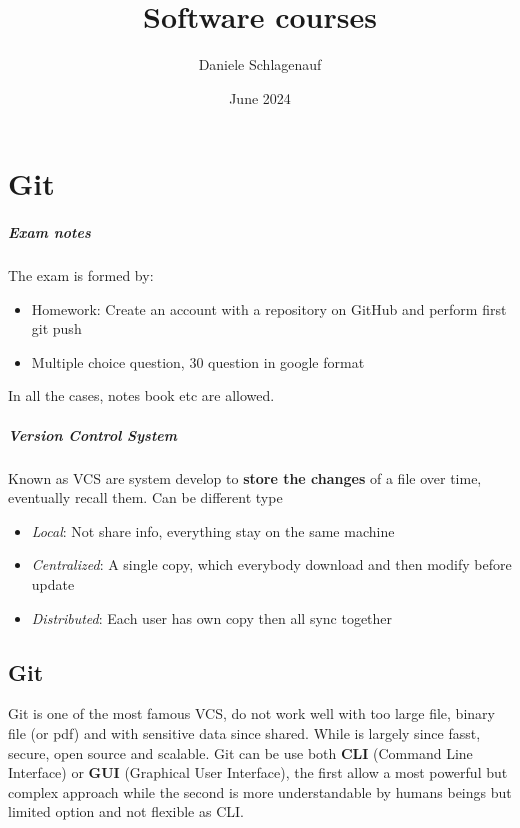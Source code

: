 \documentclass{report}
\title{Software courses}
\author{Daniele Schlagenauf}
\date{June 2024}
\begin{document}
\maketitle

\chapter{Git}


\paragraph{Exam notes}
The exam is formed by:
\begin{itemize}
    \item Homework: Create an account with a repository on GitHub and perform first git push
    \item Multiple choice question, 30 question in google format  
\end{itemize}
In all the cases, notes book etc are allowed.

\paragraph{Version Control System}
Known as VCS are system develop to \textbf{store the changes} of a file over time, eventually recall them. Can be different type
\begin{itemize}
    \item \textit{Local}: Not share info, everything stay on the same machine 
    \item \textit{Centralized}:  A single copy, which everybody download and then modify before 
    update
    \item \textit{Distributed}: Each user has own copy then all sync together 
\end{itemize}

\section{Git}
Git is one of the most famous VCS, do not work well with too large file, binary file (or pdf) and with sensitive data since shared. While is largely since fasst, secure, open source and scalable.
\vspace{2mm}
Git can be use both \textbf{CLI} (Command Line Interface) or \textbf{GUI} (Graphical User Interface), the first allow a most powerful but complex approach while the second is more understandable by humans beings but limited option and not flexible as CLI.
\end{document}
